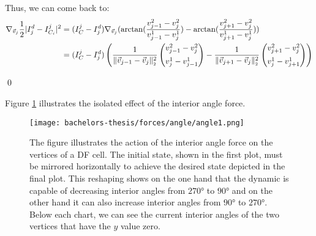 \begin{proposition}
	Thus, we can come back to: 
	\begin{align*}
		\nabla_{\vec{v}_j} \frac{1}{2}| I_{j}^d - I^{j}_{C_i} |^2 
		&= (I^j_{C} - I_{j}^d) \nabla_{\vec{v}_j} (\arctan(\frac{v_{j-1}^2 - v_{j}^2}{v_{j-1}^1 - v_{j}^1}) - \arctan(\frac{v_{j+1}^2 - v_{j}^2}{v_{j+1}^1 - v_{j}^1})) \\
		&= (I^j_{C} - I_{j}^d) \left( 
		  \frac{1}{\norm[\vec{v}_{j-1} - \vec{v}_j]^2} \begin{pmatrix}
			v_{j-1}^2 - v_{j}^2 \\[0.5em]
			v_{j}^1 - v_{j-1}^1
		\end{pmatrix} 
		- \frac{1}{\norm[\vec{v}_{j+1} - \vec{v}_j]^2} \begin{pmatrix}
			v_{j+1}^2 - v_{j}^2 \\[0.5em]
			v_{j}^1 - v_{j+1}^1
		\end{pmatrix} \right)
	\end{align*}

	\qed
\end{proposition}

Figure \ref{fig:angleForce} illustrates the isolated effect of the interior angle force.

\begin{figure}
	\begin{center}
		\texttt{[image: bachelors-thesis/forces/angle/angle1.png]}
		\caption{The figure illustrates the action of the interior angle force on the vertices of a DF cell.
		The initial state, shown in the first plot, must be mirrored horizontally to achieve the desired state depicted in the final plot.
		This reshaping shows on the one hand that the dynamic is capable of decreasing interior angles from $270$° to $90$° and on the other hand it can also increase interior angles from $90$° to $270$°. 
		Below each chart, we can see the current interior angles of the two vertices that have the $y$ value zero. 
		}
		\label{fig:angleForce}
	\end{center}
\end{figure}





 

